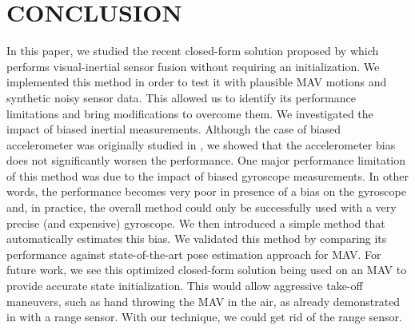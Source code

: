 \documentclass[letterpaper, 10 pt, journal, twoside]{IEEEtran}  %
\begin{document}
\section{CONCLUSION}\label{SectionConclusion}


In this paper, we studied the recent closed-form solution proposed by \cite{Martinelli2014} which performs visual-inertial sensor fusion without requiring an initialization.
We implemented this method in order to test it with plausible MAV motions and synthetic noisy sensor data.
This allowed us to identify its performance limitations and bring modifications to overcome them.
We investigated the impact of biased inertial measurements.
Although the case of biased accelerometer was originally studied in \cite{Martinelli2014}, we showed that the accelerometer bias does not significantly worsen the performance.
One major performance limitation of this method was due to the impact of biased gyroscope measurements.
In other words, the performance becomes very poor in presence of a bias on the gyroscope and, in practice, the overall method could only be successfully used with a very precise (and expensive) gyroscope.
We then introduced a simple method that automatically estimates this bias.
We validated this method by comparing its performance against state-of-the-art pose estimation approach for MAV.
For future work, we see this optimized closed-form solution being used on an MAV to provide accurate state initialization.
This would allow aggressive take-off maneuvers, such as hand throwing the MAV in the air, as already demonstrated in \cite{Faessler2015} with a range sensor.
With our technique, we could get rid of the range sensor.

\printbibliography
\end{document}
